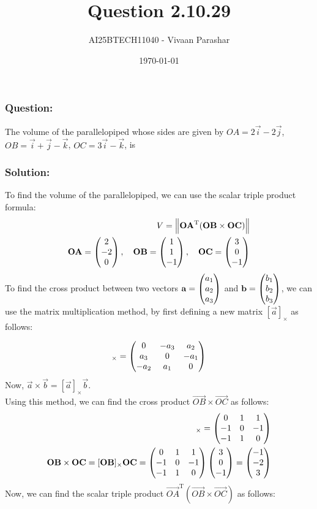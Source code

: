 \documentclass{beamer}
\title{Question 2.10.29}
\author{AI25BTECH11040 - Vivaan Parashar}
\date{\today}
\begin{document}
\frame{\titlepage}

\begin{frame}
    \frametitle{Question: }
    The volume of the parallelopiped whose sides are given by $\textit{OA} = 2\vec{i}-2\vec{j}$, $\textit{OB} = \vec{i}+\vec{j}-\vec{k}$, $\textit{OC} = 3\vec{i} - \vec{k}$, is
\end{frame}

\begin{frame}
    \frametitle{Solution: }
    To find the volume of the parallelopiped, we can use the scalar triple product formula:
    \begin{align}
        V = \left\lVert\mathbf{OA}^{\mathrm{T}}(\mathbf{OB} \times \mathbf{OC})\right\rVert \\
        \mathbf{OA} = \begin{pmatrix}2                                        \\ -2 \\ 0\end{pmatrix}, \quad
        \mathbf{OB} = \begin{pmatrix}1                                        \\ 1 \\ -1\end{pmatrix}, \quad
        \mathbf{OC} = \begin{pmatrix}3                                        \\ 0 \\ -1\end{pmatrix}\\
    \end{align}
    To find the cross product between two vectors $\mathbf{a} = \begin{pmatrix}a_1 \\ a_2 \\ a_3\end{pmatrix}$ and $\mathbf{b} = \begin{pmatrix}b_1 \\ b_2 \\ b_3\end{pmatrix}$, we can use the matrix multiplication method, by first defining a new matrix $[\vec{a}]_{\times}$ as follows:
\end{frame}
\begin{frame}
    \begin{align}
        [\vec{a}]_{\times} = \myvec{0 & -a_3 & a_2 \\ a_3 & 0 & -a_1 \\ -a_2 & a_1 & 0} \\
    \end{align}
    Now, $\vec{a} \times \vec{b} = [\vec{a}]_{\times}\vec{b}$.\\
    Using this method, we can find the cross product $\vec{OB} \times \vec{OC}$ as follows:
    \begin{align}
        [\vec{OB}]_{\times} = \myvec{0                                    & 1 & 1 \\ -1 & 0 & -1 \\ -1 & 1 & 0} \\
        \vec{OB} \times \vec{OC} = [\vec{OB}]_{\times}\vec{OC} = \myvec{0 & 1 & 1 \\ -1 & 0 & -1 \\ -1 & 1 & 0}\myvec{3 \\ 0 \\ -1} = \myvec{-1 \\ -2 \\ 3}
    \end{align}
    Now, we can find the scalar triple product $\vec{OA}^{\mathrm{T}}(\vec{OB} \times \vec{OC})$ as follows:
\end{frame}
\end{document}
